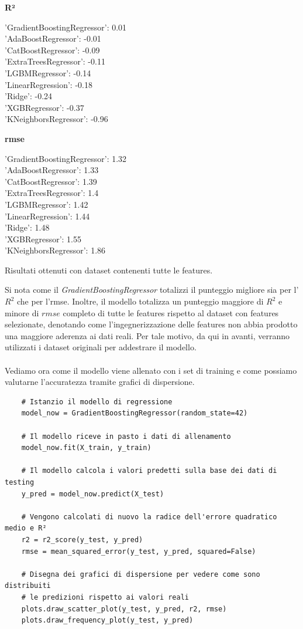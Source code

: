 \documentclass{article}
\begin{document}
\begin{multicols}{2}
\begin{center}
    \textbf{R²}
\end{center}
'GradientBoostingRegressor': 0.01\\
'AdaBoostRegressor': -0.01\\
'CatBoostRegressor': -0.09\\
'ExtraTreesRegressor': -0.11\\
'LGBMRegressor': -0.14\\
'LinearRegression': -0.18\\
'Ridge': -0.24\\
'XGBRegressor': -0.37\\
'KNeighborsRegressor': -0.96
\columnbreak
\begin{center}
    \textbf{rmse}
\end{center}
'GradientBoostingRegressor': 1.32\\
'AdaBoostRegressor': 1.33\\
'CatBoostRegressor': 1.39\\
'ExtraTreesRegressor': 1.4\\
'LGBMRegressor': 1.42\\
'LinearRegression': 1.44\\
'Ridge': 1.48\\'XGBRegressor': 1.55\\
'KNeighborsRegressor': 1.86
\end{multicols}
\begin{center}
    Risultati ottenuti con dataset contenenti tutte le features.
\end{center}
Si nota come il \textit{GradientBoostingRegressor} totalizzi il punteggio migliore sia per l'$R^2$ che per l'rmse. Inoltre, il modello totalizza un punteggio maggiore di $R^2$ e minore di $rmse$ completo di tutte le features rispetto al dataset con features selezionate, denotando come l'ingegnerizzazione delle features non abbia prodotto una maggiore aderenza ai dati reali. Per tale motivo, da qui in avanti, verranno utilizzati i dataset originali per addestrare il modello.\\\\
Vediamo ora come il modello viene allenato con i set di training e come possiamo valutarne l'accuratezza tramite grafici di dispersione.
\begin{verbatim}
    # Istanzio il modello di regressione
    model_now = GradientBoostingRegressor(random_state=42)

    # Il modello riceve in pasto i dati di allenamento
    model_now.fit(X_train, y_train)

    # Il modello calcola i valori predetti sulla base dei dati di testing
    y_pred = model_now.predict(X_test)

    # Vengono calcolati di nuovo la radice dell'errore quadratico medio e R²
    r2 = r2_score(y_test, y_pred)
    rmse = mean_squared_error(y_test, y_pred, squared=False)

    # Disegna dei grafici di dispersione per vedere come sono distribuiti 
    # le predizioni rispetto ai valori reali
    plots.draw_scatter_plot(y_test, y_pred, r2, rmse)
    plots.draw_frequency_plot(y_test, y_pred)
\end{verbatim}
\end{document}
